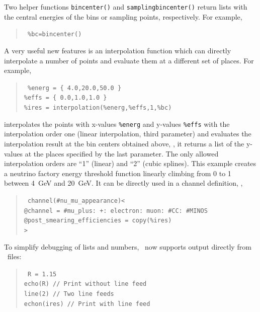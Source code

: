 Two helper functions {\tt bincenter()} 
 and {\tt samplingbincenter()}  return lists with the central energies of the bins or sampling points, respectively. For example,
\begin{quote}
{\tt
 \%bc=bincenter() 
}
\end{quote}
A very useful new features is an interpolation function which can directly interpolate a number of
points and evaluate them at a different set of places. For example,
\begin{quote}
{\tt
 \%energ = \{ 4.0,20.0,50.0 \} \\
 \%effs = \{ 0.0,1.0,1.0 \} \\
 \%ires = interpolation(\%energ,\%effs,1,\%bc) 
}
\end{quote}
interpolates the points with x-values {\tt \%energ} and y-values {\tt \%effs} with the interpolation order one (linear interpolation, third parameter) and evaluates the interpolation result at the bin centers obtained above, \ie, it returns a list of the y-values at the places specified by the last parameter. The only allowed interpolation orders are ``1'' (linear) and ``2'' (cubic splines). This example creates
a neutrino factory energy threshold function linearly climbing from 0 to 1 between 4~GeV and 20~GeV. It can be directly used in a channel definition, \eg, 
\begin{quote}
{\tt
 channel(\#nu\_mu\_appearance)< \\
\hspace*{0.5cm}	@channel = \#mu\_plus: +: electron: muon: \#CC: \#MINOS\ \\
\hspace*{0.5cm}	@post\_smearing\_efficiencies = copy(\%ires) \\
>
}
\end{quote}


To simplify debugging of lists and numbers, \GLOBES\ now supports output directly
from \AEDL\ files:
\begin{quote}
{\tt 
 R = 1.15 \\
 echo(R) // Print without line feed \\
 line(2) // Two line feeds \\
 echon(ires) // Print with line feed 
}
\end{quote}



